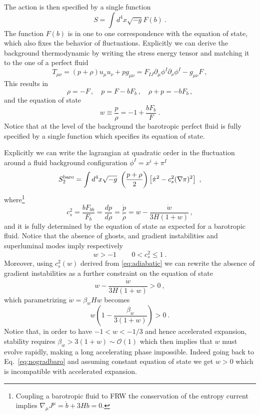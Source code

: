 The action is then specified by a single function
\begin{equation}
S=\int d^4x\sqrt{-g} F(b)\ .    
\end{equation}
The function $F(b)$ is in one to one correspondence with the equation of state, which also fixes the behavior of fluctuations. Explicitly we can derive the background thermodynamic by writing the stress energy tensor and matching it to the one of a perfect fluid 
\begin{equation}
    T_{\mu\nu}=(p+\rho)u_\mu u_\nu+p g_{\mu\nu}=F_{IJ} \partial_\mu\phi^I \partial_\nu\phi^I-g_{\mu\nu} F\ ,
\end{equation}
This results in
\begin{equation}
    \rho=-F\,,\quad p=F-bF_b\,, \quad \rho+p=-bF_b\,,
\end{equation}
and the equation of state 
\begin{equation}
    w\equiv\frac{p}{\rho}=-1+\frac{b F_b}{F}\ .
\end{equation}
Notice that at the level of the background the barotropic perfect fluid is fully specified by a single function which specifies its equation of state.  

Explicitly we can write the lagrangian at quadratic order in the fluctuation around a fluid background configuration $\phi^I=x^i+\pi^I$
\begin{equation}
S_2^{\rm{baro}}=\int d^4x\sqrt{-g}\,\,\left(\frac{p+\rho}{2}\right)\left[\dot\pi^2-c_s^2(\nabla\pi)^2\right]\ ,
\end{equation}
where\footnote{Coupling a barotropic fluid to FRW the conservation of the entropy current implies $\nabla_\mu J^{\mu}=\dot{b}+3Hb=0$.} 
\begin{equation}
 c_s^2=\frac{b F_{bb}}{ F_b}=\frac{d p}{d\rho}=\frac{\dot{p}}{\dot{\rho}}=w-\frac{\dot{w}}{3H(1+w)}\,,  \label{eq:adiabatic}
\end{equation}
and it is fully determined by the equation of state as expected for a barotropic fluid. 
Notice that the absence of ghosts, and gradient instabilities and superluminal modes imply respectively 
\begin{equation}
w>-1\,\qquad 0<c_s^2\leq1\ .
\end{equation}
Moreover, using $c_s^2(w)$ derived from \eqref{eq:adiabatic} we can rewrite the absence of gradient instabilities as a further constraint on the equation of state 
\begin{equation}
w-\frac{\dot{w}}{3H(1+w)}>0\ , \label{eq:nogradbaro}
\end{equation}
which parametrizing $\dot w= \beta_w H w$ becomes 
\begin{equation}
 w\left(1-\frac{\beta_w}{3(1+w)}\right)>0\ .   
\end{equation}
Notice that, in order to have $-1<w<-1/3$ and hence accelerated expansion, stability requires $\beta_w>3(1+w)\sim\mathcal{O}(1)$ which then implies that $w$ must evolve rapidly, making a long accelerating phase impossible. Indeed going back to Eq.~\eqref{eq:nogradbaro} and assuming constant equation of state we get $w>0$ which is incompatible with accelerated expansion. 


